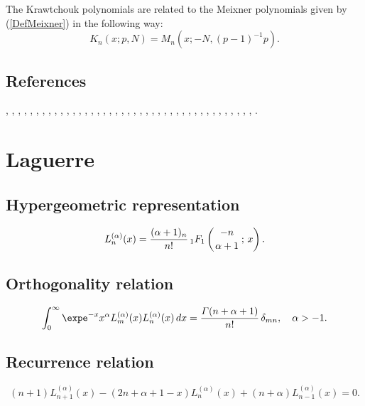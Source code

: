 \documentclass[envcountchap,graybox]{svmono}
\newcommand{\hyp}[5]{\mbox{}_{#1}{F}_{#2}
\left(\genfrac{}{}{0pt}{}{#3}{#4}\,;\,#5\right)}
\renewcommand{\Gamma}{\varGamma}
\begin{document}
\noindent
The Krawtchouk polynomials are related to the Meixner polynomials given by (\ref{DefMeixner})
in the following way:
$$K_n(x;p,N)=M_n(x;-N,(p-1)^{-1}p).$$

\subsection*{References}
\cite{AlSalam90}, \cite{AndrewsAskey85}, \cite{Area+II}, \cite{Askey75}, \cite{Askey89I},
\cite{AskeyGasper77}, \cite{AskeyWilson85}, \cite{AtakRahmanSuslov}, \cite{Campigotto+},
\cite{LChiharaStanton}, \cite{Chihara78}, \cite{Dette95}, \cite{Dominici}, \cite{Dunkl76},
\cite{Dunkl84}, \cite{DunklRamirez}, \cite{Erdelyi+}, \cite{FeinsilverSchott},
\cite{Gasper73I}, \cite{Gasper74}, \cite{HoareRahman}, \cite{Ismail2005II}, \cite{Karlin58},
\cite{Koorn82}, \cite{Koorn88}, \cite{LabelleYehI}, \cite{LabelleYehII}, \cite{Lesky62},
\cite{Lesky89}, \cite{Lesky94I}, \cite{Lesky95II}, \cite{LewanowiczII}, \cite{Nikiforov+},
\cite{NikiforovUvarov}, \cite{Qiu}, \cite{Rahman78I}, \cite{Rahman79}, \cite{Stanton84},
\cite{Stanton90}, \cite{Szego75}, \cite{Zarzo+}, \cite{Zeng90}.


\section{Laguerre}

\par\setcounter{equation}{0}

\subsection*{Hypergeometric representation}
\begin{equation}
\label{DefLaguerre}
L_n^{(\alpha)}(x)=\frac{(\alpha+1)_n}{n!}\,\hyp{1}{1}{-n}{\alpha+1}{x}.
\end{equation}

\subsection*{Orthogonality relation}
\begin{equation}
\label{OrtLaguerre}
\int_0^{\infty}\expe^{-x}x^{\alpha}L_m^{(\alpha)}(x)L_n^{(\alpha)}(x)\,dx=
\frac{\Gamma(n+\alpha+1)}{n!}\,\delta_{mn},\quad\alpha > -1.
\end{equation}

\subsection*{Recurrence relation}
\begin{equation}
\label{RecLaguerre}
(n+1)L_{n+1}^{(\alpha)}(x)-(2n+\alpha+1-x)L_n^{(\alpha)}(x)+(n+\alpha)L_{n-1}^{(\alpha)}(x)=0.
\end{equation}
\end{document}
